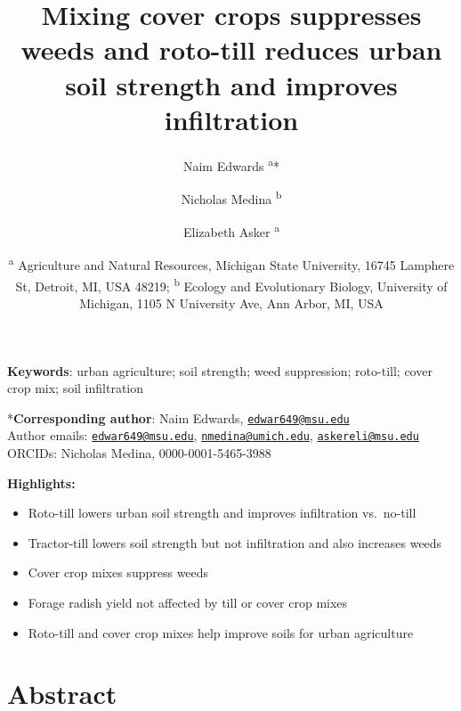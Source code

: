 \documentclass[
  12pt,
]{article}
\title{Mixing cover crops suppresses weeds and roto-till reduces urban soil strength and improves infiltration}
\author{Naim Edwards \textsuperscript{a}* \and Nicholas Medina \textsuperscript{b} \and Elizabeth Asker \textsuperscript{a}}
\date{\scriptsize \textsuperscript{a} Agriculture and Natural Resources, Michigan State University, 16745 Lamphere St, Detroit, MI, USA 48219; \textsuperscript{b} Ecology and Evolutionary Biology, University of Michigan, 1105 N University Ave, Ann Arbor, MI, USA}
\begin{document}
\maketitle

\hfill\break
\hfill\break

\textbf{Keywords}: urban agriculture; soil strength; weed suppression; roto-till; cover crop mix; soil infiltration

\hfill\break
\hfill\break

*\textbf{Corresponding author}: Naim Edwards, \href{mailto:edwar649@msu.edu}{\nolinkurl{edwar649@msu.edu}}\\
Author emails: \href{mailto:edwar649@msu.edu}{\nolinkurl{edwar649@msu.edu}}, \href{mailto:nmedina@umich.edu}{\nolinkurl{nmedina@umich.edu}}, \href{mailto:askereli@msu.edu}{\nolinkurl{askereli@msu.edu}}\\
ORCIDs: Nicholas Medina, 0000-0001-5465-3988

\newpage

\textbf{Highlights:}

\begin{itemize}
\item
  Roto-till lowers urban soil strength and improves infiltration vs.~no-till
\item
  Tractor-till lowers soil strength but not infiltration and also increases weeds
\item
  Cover crop mixes suppress weeds
\item
  Forage radish yield not affected by till or cover crop mixes
\item
  Roto-till and cover crop mixes help improve soils for urban agriculture
\end{itemize}

\newpage

\hypertarget{abstract}{%
\section*{Abstract}\label{abstract}}
\end{document}
